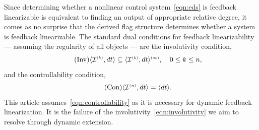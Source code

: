\documentclass[a4paper]{ifacconf}
\begin{document}
Since determining whether a nonlinear control system~\eqref{eqn:eds} is feedback linearizable is equivalent to finding an output of appropriate relative degree, it comes as no surprise that the derived flag structure determines whether a system is feedback linearizable.
The standard dual conditions for feedback linearizability --- assuming the regularity of all objects --- are the involutivity condition,
%
\begin{equation}
  \tag{Inv}
  \label{eqn:involutivity}
  \langle \mathcal{I}^{\smash{\scriptscriptstyle(k)}}, dt \rangle \subseteq \langle \mathcal{I}^{\smash{\scriptscriptstyle(k)}}, dt \rangle^{\smash{\scriptscriptstyle(\infty)}},
  \quad 0 \leq k \leq n,
\end{equation}
%
and the controllability condition,
\begin{equation}
  \tag{Con}
  \label{eqn:controllability}
  \langle \mathcal{I}^{\smash{\scriptscriptstyle(n)}}, dt \rangle = \langle dt \rangle.
\end{equation}
%
This article assumes~\eqref{eqn:controllability} as it is necessary for dynamic feedback linearization.
It is the failure of the involutivity~\eqref{eqn:involutivity} we aim to resolve through dynamic extension.

\end{document}
